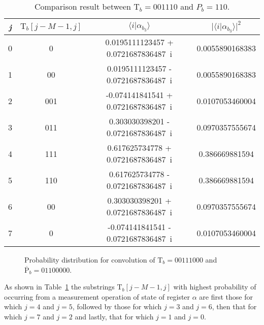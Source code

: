 \begin{example}
	\begin{table}[h!]
	\begin{center}
	\begin{tabular}{|| c | c | c | c ||}
		\hline 
		\textit{j} & $\text{T}_b [j-M-1,j]$ & $\langle i \vert \alpha_{b_3} \rangle$ &  $\vert \langle i \vert \alpha_{b_3} \rangle \vert^2$\\
		\hline\hline
			0 & 0	  & 0.0195111123457 + 0.0721687836487\ i & 0.0055890168383\\
		\hline
			1 & 00   & 0.0195111123457 - 0.0721687836487\ i & 0.0055890168383\\
		\hline
			2 & 001 & -0.074141841541 + 0.0721687836487\ i & 0.0107053460004\\
		\hline
			3 & 011 & 0.303030398201 - 0.0721687836487\ i   & 0.0970357555674\\
		\hline
			4 & 111 & 0.617625734778 + 0.0721687836487\ i  & 0.386669881594\\
		\hline
			5 & 110 & 0.617625734778 - 0.0721687836487\ i   & 0.386669881594\\
		\hline
			6 & 00   & 0.303030398201 + 0.0721687836487\ i  & 0.0970357555674\\
		\hline
			7 & 0    & -0.074141841541 - 0.0721687836487\ i  & 0.0107053460004\\
		\hline
	\end{tabular}
	\end{center}
	\caption{Comparison result between $\text{T}_b = 001110$ and $P_b = 110$.}
	\label{tab:convolution-b-appendix}
	\end{table}

		\begin{figure}
			\centering
			\caption{Probability distribution for convolution of $\text{T}_b = 00111000$ and $\overline{\text{P}}_b = 01100000$.}
			\label{fig:convolution-b-appendix}
		\end{figure}

As shown in Table~\ref{tab:convolution-b-appendix} the substrings $\text{T}_b [j-M-1, j]$ with highest probability of occurring from a measurement operation of state of register $\alpha$ are first those for which $j=4$ and $j=5$, followed by those for which $j=3$ and $j=6$, then that for which $j=7$ and $j=2$ and lastly, that for which $j=1$ and $j=0$.
\end{example}
